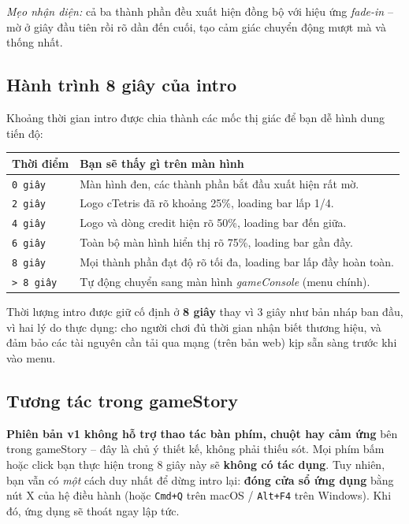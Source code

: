 \documentclass[12pt,a4paper]{article}
\begin{document}
\noindent\textit{Mẹo nhận diện:} cả ba thành phần đều xuất hiện đồng bộ với hiệu ứng \emph{fade-in} -- mờ ở giây đầu tiên rồi rõ dần đến cuối, tạo cảm giác chuyển động mượt mà và thống nhất.

\subsection{Hành trình 8 giây của intro}
Khoảng thời gian intro được chia thành các mốc thị giác để bạn dễ hình dung tiến độ:

\vspace{4pt}
\begin{tabularx}{\linewidth}{|l|X|}
    \hline
    \textbf{Thời điểm} & \textbf{Bạn sẽ thấy gì trên màn hình} \\
    \hline
    \texttt{0 giây}    & Màn hình đen, các thành phần bắt đầu xuất hiện rất mờ. \\
    \hline
    \texttt{2 giây}    & Logo cTetris đã rõ khoảng 25\%, loading bar lấp 1/4. \\
    \hline
    \texttt{4 giây}    & Logo và dòng credit hiện rõ 50\%, loading bar đến giữa. \\
    \hline
    \texttt{6 giây}    & Toàn bộ màn hình hiển thị rõ 75\%, loading bar gần đầy. \\
    \hline
    \texttt{8 giây}    & Mọi thành phần đạt độ rõ tối đa, loading bar lấp đầy hoàn toàn. \\
    \hline
    \texttt{> 8 giây}  & Tự động chuyển sang màn hình \textit{gameConsole} (menu chính). \\
    \hline
\end{tabularx}

\vspace{4pt}
\noindent Thời lượng intro được giữ cố định ở \textbf{8 giây} thay vì 3 giây như bản nháp ban đầu, vì hai lý do thực dụng: cho người chơi đủ thời gian nhận biết thương hiệu, và đảm bảo các tài nguyên cần tải qua mạng (trên bản web) kịp sẵn sàng trước khi vào menu.

\subsection{Tương tác trong gameStory}
\textbf{Phiên bản v1 không hỗ trợ thao tác bàn phím, chuột hay cảm ứng} bên trong gameStory -- đây là chủ ý thiết kế, không phải thiếu sót. Mọi phím bấm hoặc click bạn thực hiện trong 8 giây này sẽ \textbf{không có tác dụng}. Tuy nhiên, bạn vẫn có \emph{một} cách duy nhất để dừng intro lại: \textbf{đóng cửa sổ ứng dụng} bằng nút X của hệ điều hành (hoặc \texttt{Cmd+Q} trên macOS / \texttt{Alt+F4} trên Windows). Khi đó, ứng dụng sẽ thoát ngay lập tức.
\end{document}
